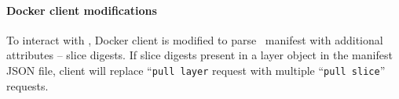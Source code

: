 \paragraph{Docker client modifications}
 
To interact with \sysname, Docker client is modified to 
parse \sysname~manifest with additional attributes -- slice digests.
If slice digests present in a layer object in the manifest JSON file, 
client will replace ``\texttt{pull layer} request with multiple ``\texttt{pull slice}'' requests.
  






